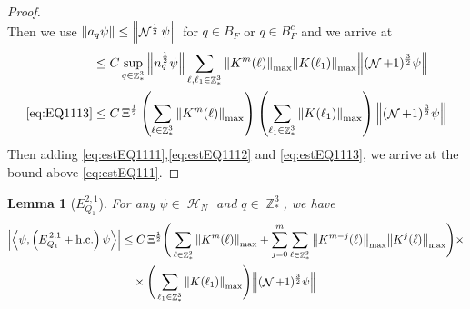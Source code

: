 \documentclass[sn-mathphys, Numbered ,a4paper]{sn-jnl}%
\DeclareMathOperator{\Z}{\mathbb{Z}}
\DeclareMathOperator{\HH}{\mathcal{H}}
\DeclareMathOperator{\NN}{\mathcal{N}}
\newcommand{\half}{\frac{1}{2}}
\newcommand{\eva}[1]{\left\langle #1 \right\rangle}
\theoremstyle{plain}
\newtheorem{lemma}[theorem]{Lemma}
\theoremstyle{definition}
\theoremstyle{remark}
\theoremstyle{plain}
\theoremstyle{definition}
\theoremstyle{remark}
\begin{document}
\begin{proof}
\begin{equation}
\end{equation}
Then we use $\norm{a_q\psi}\leq \norm{\NN^\half\psi}$ for $q \in B_F$ or $q \in B^c_F$ and we arrive at 
\begin{align}
	&\leq C \sup\limits_{q \in \Z^3_*} \norm{ n^\half_{q} \psi}\sum\limits_{\ell, \ell_1\in \Z^3_*} \norm{K^m(\ell)}_{\mathrm{max}} \norm{ K(\ell_1)}_{\mathrm{max}} \norm{ (\NN+1)^{\frac{3}{2}} \psi } \nonumber\\
	\eqref{eq:EQ1113}&\leq  C \,\Xi^\half \left(\sum\limits_{\ell \in \Z^3_*} \norm{K^m(\ell)}_{\mathrm{max}}\right)\left( \sum\limits_{\ell_1\in \Z^3_*} \norm{ K(\ell_1)}_{\mathrm{max}} \right) \norm{ (\NN+1)^{\frac{3}{2}} \psi }\label{eq:estEQ1113}
\end{align}
Then adding \eqref{eq:estEQ1111},\eqref{eq:estEQ1112} and \eqref{eq:estEQ1113}, we arrive at the bound above \eqref{eq:estEQ111}.
\end{proof}
\begin{lemma}[$E_{Q_1}^{2,1}$]
For any $\psi \in \HH_N$ and $q \in \Z^3_*$, we have
\begin{align}
	\abs{\eva{\psi,\left(E^{\,2,1}_{Q_1}+\mathrm{h.c.}\right) \psi }}\nonumber
	&\leq  C\, \Xi^{\half} \Bigg(\sum\limits_{\ell \in \Z^3_*} \norm{K^m(\ell)}_{\mathrm{max}} + \sum\limits_{j=0}^m \sum\limits_{\ell \in \Z^3_*}\norm{K^{m-j}(\ell)}_{\mathrm{max}}\norm{K^{j}(\ell)}_{\mathrm{max}}\Bigg)\times\\&\quad\times \Bigg( \sum\limits_{\ell_1 \in \Z^3_*}\norm{K(\ell_1)}_{\mathrm{max}} \Bigg)  \norm { (\NN+1)^{\frac{3}{2}} \psi } \label{eq:estEQ121}
\end{align}
\end{lemma}
\end{document}
